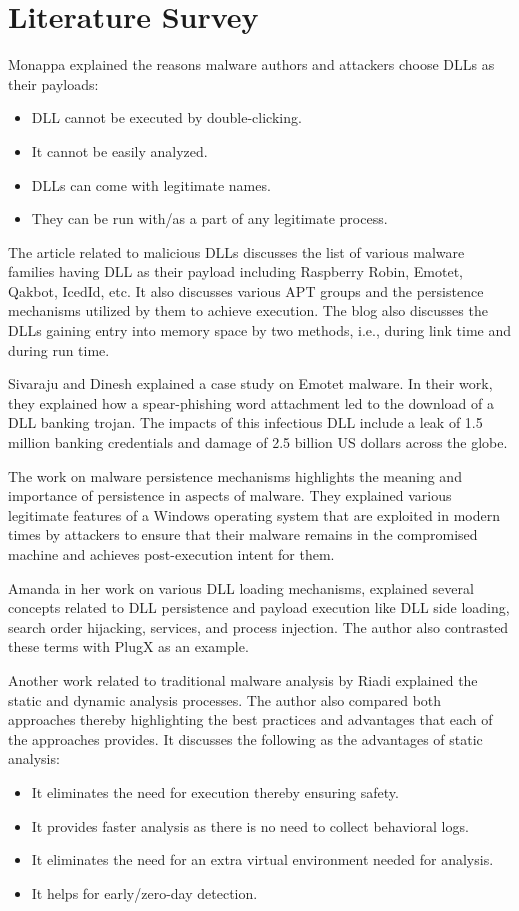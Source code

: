 \documentclass{article}
\begin{document}
\section{Literature Survey}
Monappa\cite{monappa1, monappa2} explained the reasons malware authors and attackers choose DLLs as their payloads:
\begin{itemize}
    \item DLL cannot be executed by double-clicking.
    \item It cannot be easily analyzed.
    \item DLLs can come with legitimate names.
    \item They can be run with/as a part of any legitimate process.
\end{itemize}

The article related to malicious DLLs\cite{article_dlls} discusses the list of various malware families having DLL as their payload including Raspberry Robin, Emotet, Qakbot, IcedId, etc. It also discusses various APT groups and the persistence mechanisms utilized by them to achieve execution. The blog also discusses the DLLs gaining entry into memory space by two methods, i.e., during link time and during run time.

Sivaraju and Dinesh\cite{sivaraju_dinesh} explained a case study on Emotet malware. In their work, they explained how a spear-phishing word attachment led to the download of a DLL banking trojan. The impacts of this infectious DLL include a leak of 1.5 million banking credentials and damage of 2.5 billion US dollars across the globe.

The work on malware persistence mechanisms\cite{persistence_mechanisms} highlights the meaning and importance of persistence in aspects of malware. They explained various legitimate features of a Windows operating system that are exploited in modern times by attackers to ensure that their malware remains in the compromised machine and achieves post-execution intent for them.

Amanda\cite{amanda} in her work on various DLL loading mechanisms, explained several concepts related to DLL persistence and payload execution like DLL side loading, search order hijacking, services, and process injection. The author also contrasted these terms with PlugX as an example.

Another work related to traditional malware analysis by Riadi\cite{riadi} explained the static and dynamic analysis processes. The author also compared both approaches thereby highlighting the best practices and advantages that each of the approaches provides. It discusses the following as the advantages of static analysis:
\begin{itemize}
    \item It eliminates the need for execution thereby ensuring safety.
    \item It provides faster analysis as there is no need to collect behavioral logs.
    \item It eliminates the need for an extra virtual environment needed for analysis.
    \item It helps for early/zero-day detection.
\end{itemize}
\end{document}

